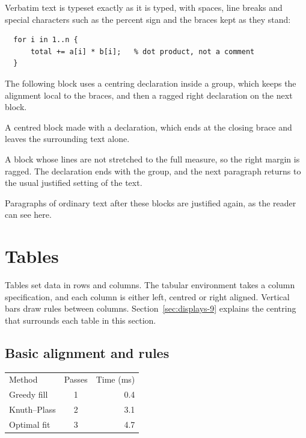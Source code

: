 \documentclass{article}
\begin{document}
Verbatim text is typeset exactly as it is typed, with spaces, line breaks and special
characters such as the percent sign and the braces kept as they stand:

\begin{verbatim}
  for i in 1..n {
      total += a[i] * b[i];   % dot product, not a comment
  }
\end{verbatim}

The following block uses a centring declaration inside a group, which keeps the
alignment local to the braces, and then a ragged right declaration on the next block.

{\centering A centred block made with a declaration, which ends at the closing
brace and leaves the surrounding text alone.\par}

{\raggedright A block whose lines are not stretched to the full measure, so the
right margin is ragged. The declaration ends with the group, and the next paragraph
returns to the usual justified setting of the text.\par}

Paragraphs of ordinary text after these blocks are justified again, as the reader can
see here.

\section{Tables}\label{sec:tables-9}

Tables set data in rows and columns. The tabular environment takes a column
specification, and each column is either left, centred or right aligned. Vertical bars
draw rules between columns. Section~\ref{sec:displays-9} explains the centring that surrounds each table in
this section.

\subsection{Basic alignment and rules}\label{sec:tables-basic-9}

\begin{center}
\begin{tabular}{l c r}
Method & Passes & Time (ms) \\
Greedy fill      & 1 & 0.4 \\
Knuth--Plass     & 2 & 3.1 \\
Optimal fit      & 3 & 4.7 \\
\end{tabular}
\end{center}
\end{document}
